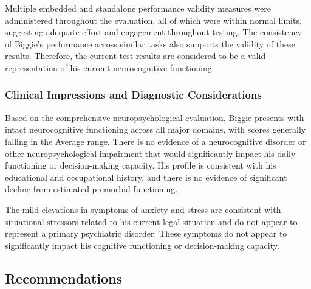 \documentclass[
  letterpaper,
  DIV=11,
  numbers=noendperiod]{scrartcl}
\begin{document}
Multiple embedded and standalone performance validity measures were
administered throughout the evaluation, all of which were within normal
limits, suggesting adequate effort and engagement throughout testing.
The consistency of Biggie's performance across similar tasks also
supports the validity of these results. Therefore, the current test
results are considered to be a valid representation of his current
neurocognitive functioning.

\subsubsection{Clinical Impressions and Diagnostic
Considerations}\label{clinical-impressions-and-diagnostic-considerations}

Based on the comprehensive neuropsychological evaluation, Biggie
presents with intact neurocognitive functioning across all major
domains, with scores generally falling in the Average range. There is no
evidence of a neurocognitive disorder or other neuropsychological
impairment that would significantly impact his daily functioning or
decision-making capacity. His profile is consistent with his educational
and occupational history, and there is no evidence of significant
decline from estimated premorbid functioning.

The mild elevations in symptoms of anxiety and stress are consistent
with situational stressors related to his current legal situation and do
not appear to represent a primary psychiatric disorder. These symptoms
do not appear to significantly impact his cognitive functioning or
decision-making capacity.

\subsection{Recommendations}\label{recommendations}
\end{document}
